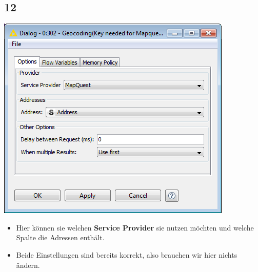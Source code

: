 \documentclass{beamer}
\begin{document}
\subsection{12}
\begin{frame}
	\begin{center}
  		\includegraphics[height=0.6\textheight]{12.png}
	\end{center}
	\begin{itemize}
		\item Hier können sie welchen \textbf{Service Provider} sie nutzen möchten und welche Spalte die Adressen enthält.
		\item Beide Einstellungen sind bereits korrekt, also brauchen wir hier nichts ändern.
	\end{itemize}
\end{frame}
\end{document}
